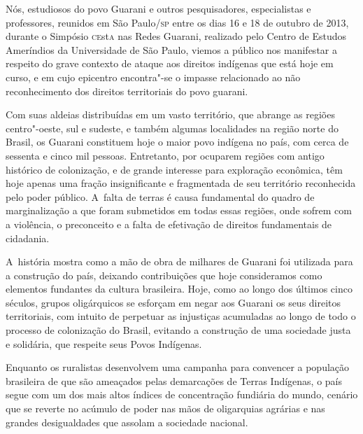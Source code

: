 
Nós, estudiosos do povo Guarani e outros pesquisadores, especialistas e
professores, reunidos em São Paulo/\textsc{sp} entre os dias 16 e 18 de outubro
de 2013, durante o Simpósio \textsc{ce}st\textsc{a} nas Redes Guarani, realizado pelo
Centro de Estudos Ameríndios da Universidade de São Paulo, viemos a
público nos manifestar a respeito do grave contexto de ataque aos
direitos indígenas que está hoje em curso, e em cujo epicentro
encontra"-se o impasse relacionado ao não reconhecimento dos direitos
territoriais do povo guarani.

Com suas aldeias distribuídas em um vasto território, que abrange as
regiões centro"-oeste, sul e sudeste, e também algumas localidades na
região norte do Brasil, os Guarani constituem hoje o maior povo
indígena no país, com cerca de sessenta e cinco mil pessoas.
Entretanto, por ocuparem regiões com antigo histórico de colonização, e
de grande interesse para exploração econômica, têm hoje apenas uma
fração insignificante e fragmentada de seu território reconhecida pelo
poder público. A~falta de terras é causa fundamental do quadro de
marginalização a que foram submetidos em todas essas regiões, onde
sofrem com a violência, o preconceito e a falta de efetivação de
direitos fundamentais de cidadania. 

A~história mostra como a mão de obra de milhares de Guarani foi
utilizada para a construção do país, deixando contribuições que hoje
consideramos como elementos fundantes da cultura brasileira. Hoje, como
ao longo dos últimos cinco séculos, grupos oligárquicos se esforçam em
negar aos Guarani os seus direitos territoriais, com intuito de
perpetuar as injustiças acumuladas ao longo de todo o processo de
colonização do Brasil, evitando a construção de uma sociedade justa e
solidária, que respeite seus Povos Indígenas.

Enquanto os ruralistas desenvolvem uma campanha para convencer a
população brasileira de que são ameaçados pelas demarcações de Terras
Indígenas, o país segue com um dos mais altos índices de concentração
fundiária do mundo, cenário que se reverte no acúmulo de poder nas mãos
de oligarquias agrárias e nas grandes desigualdades que assolam a
sociedade nacional. 


